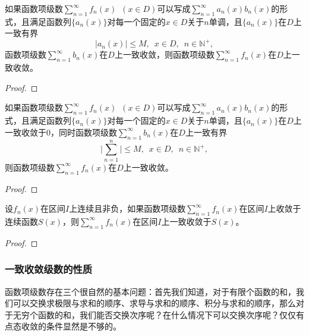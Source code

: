     \begin{theorem}[Abel判别法]
        如果函数项级数\(\sum\limits_{n=1}^{\infty}f_n(x)\enspace (x\in D)\)可以写成\(\sum_{n=1}^{\infty}a_n(x)b_n(x)\)的形式，且满足函数列\(\{a_n(x)\}\)对每一个固定的\(x\in D\)关于\(n\)单调，且\(\{a_n(x)\}\)在\(D\)上一致有界\[\lvert a_n(x)\rvert\leq M,\enspace x\in D,\enspace n\in\mathbb{N}^{+},\]函数项级数\(\sum\limits_{n=1}^{\infty}b_n(x)\)在\(D\)上一致收敛，则函数项级数\(\sum\limits_{n=1}^{\infty}f_n(x)\)在\(D\)上一致收敛。
    \end{theorem}
    \begin{proof}
        
    \end{proof}

    \begin{theorem}[Dirichlet判别法]
        如果函数项级数\(\sum\limits_{n=1}^{\infty}f_n(x)\enspace (x\in D)\)可以写成\(\sum_{n=1}^{\infty}a_n(x)b_n(x)\)的形式，且满足函数列\(\{a_n(x)\}\)对每一个固定的\(x\in D\)关于\(n\)单调，且\(\{a_n(x)\}\)在\(D\)上一致收敛于\(0\)，同时函数项级数\(\sum\limits_{n=1}^{\infty}b_n(x)\)在\(D\)上一致有界\[\lvert \sum_{n=1}^{n}\rvert\leq M,\enspace x\in D,\enspace n\in\mathbb{N}^{+},\]则函数项级数\(\sum\limits_{n=1}^{\infty}f_n(x)\)在\(D\)上一致收敛。
    \end{theorem}
    \begin{proof}
        
    \end{proof}

    \begin{theorem}
        设\(f_n(x)\)在区间\(I\)上连续且非负，如果函数项级数\(\sum\limits_{n=1}^{\infty}f_n(x)\)在区间\(I\)上收敛于连续函数\(S(x)\)，则\(\sum\limits_{n=1}^{\infty}f_n(x)\)在区间\(I\)上一致收敛于\(S(x)\)。
    \end{theorem}
    \begin{proof}
        
    \end{proof}

\subsubsection{一致收敛级数的性质}

函数项级数存在三个很自然的基本问题：首先我们知道，对于有限个函数的和，我们可以交换求极限与求和的顺序、求导与求和的顺序、积分与求和的顺序，那么对于无穷个函数的和，我们能否交换次序呢？在什么情况下可以交换次序呢？仅仅有点态收敛的条件显然是不够的。



